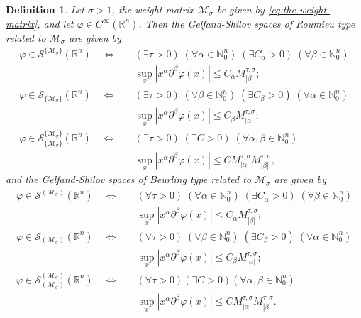 \documentclass{article}
\theoremstyle{thmstyleone}
\theoremstyle{thmstyletwo}%
\theoremstyle{thmstylethree}%
\newtheorem{Definition}[Theorem]{Definition}%
\begin{document}
\begin{Definition}\label{Def:extGS}
Let $\sigma>1$, the weight matrix $\mathcal{M}_\sigma$ be given by 
\eqref{eq:the-weight-matrix}, and let $\varphi\in C^\infty(\mathbb R^n)$. Then
the Gelfand-Shilov spaces of Roumieu type related to $\mathcal{M}_\sigma$ are given by
\begin{align*}
\varphi\in \mathcal S^{\{\mathcal{M}_\sigma\}} (\mathbb R^n) \quad \Leftrightarrow \quad & (\exists \tau>0) \;(\forall \alpha\in\mathbb N_0^n)\;(\exists C_\alpha>0)\;(\forall \beta\in\mathbb N_0^n) \\
   &\sup_{x}|x^\alpha \partial^\beta \varphi(x)|\leq C_\alpha M^{\tau,\sigma}_{|\beta|};\\
    \varphi\in \mathcal S_{\{\mathcal{M}_\sigma\}} (\mathbb R^n) \quad \Leftrightarrow \quad & (\exists \tau>0) \;(\forall \beta\in\mathbb N_0^n)\;(\exists C_\beta>0)\;(\forall \alpha\in\mathbb N_0^n) \\
   &\sup_{x}|x^\alpha \partial^\beta \varphi(x)|\leq C_\beta M^{\tau,\sigma}_{|\alpha|};\\
\varphi\in \mathcal  S_{\{\mathcal{M}_\sigma\}}^{\{\mathcal{M}_\sigma\}} (\mathbb R^n) \quad \Leftrightarrow \quad & (\exists \tau>0)\;(\exists C>0)\;(\forall \alpha,\beta\in\mathbb N_0^n) \\
   &\sup_{x}|x^\alpha \partial^\beta \varphi(x)|\leq C M^{\tau,\sigma}_{|\alpha|} 
   M^{\tau,\sigma}_{|\beta|},
\end{align*}
and the Gelfand-Shilov spaces of Beurling type related to $\mathcal{M}_\sigma$ are given by
\begin{align*}
\varphi\in \mathcal S^{(\mathcal{M}_\sigma)} (\mathbb R^n) \quad \Leftrightarrow \quad & (\forall \tau>0) \;(\forall \alpha\in\mathbb N_0^n)\;(\exists C_{\alpha}>0)\;(\forall \beta\in\mathbb N_0^n) \\
   &\sup_{x}|x^\alpha \partial^\beta \varphi(x)|\leq C_{\alpha} M^{\tau,\sigma}_{|\beta|};\\
    \varphi\in \mathcal S_{(\mathcal{M}_\sigma)} (\mathbb R^n) \quad \Leftrightarrow \quad & (\forall \tau>0)\;(\forall \beta\in\mathbb N_0^n)\;(\exists C_{\beta}>0)\;(\forall \alpha\in\mathbb N_0^n) \\
   &\sup_{x}|x^\alpha \partial^\beta \varphi(x)|\leq C_{\beta}
   M^{\tau,\sigma}_{|\alpha|};\\
\varphi\in \mathcal S_{(\mathcal{M}_\sigma)}^{(\mathcal{M}_\sigma)} (\mathbb R^n) \quad \Leftrightarrow \quad & (\forall \tau>0) (\exists C>0)(\forall \alpha,\beta\in\mathbb N_0^n) \\
   &\sup_{x}|x^\alpha \partial^\beta \varphi(x)|\leq C
   M^{\tau,\sigma}_{|\alpha|}    M^{\tau,\sigma}_{|\beta|}.
\end{align*}

\end{Definition}
\end{document}
